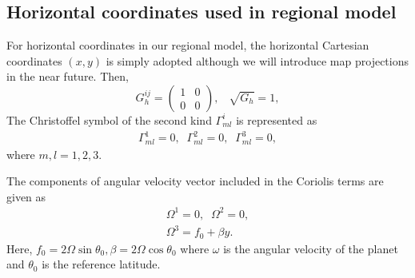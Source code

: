 \subsection{Horizontal coordinates used in regional model}
For horizontal coordinates in our regional model, 
the horizontal Cartesian coordinates $(x, y)$ is simply adopted 
although we will introduce map projections in the near future. 
Then, 
\begin{equation}
    G_h^{ij} =  \begin{pmatrix}
        1 & 0 \\
        0 & 0
      \end{pmatrix}, \;\;\;
    \sqrt{G_h}=1, 
\label{eq:metric_tensor_Jacobian_regional_model}
\end{equation}
The Christoffel symbol of the second kind  $\Gamma^i_{ml}$ is represented as 
\begin{align}
  \Gamma^1_{ml} = 0, \;\; \Gamma^2_{ml} = 0, \;\; \Gamma^3_{ml} = 0, 
\label{eq:ChristoffelSymbol2ndKind_regional_model}
\end{align}
where $m,l=1,2,3$. 


The components of angular velocity vector included in the Coriolis terms
are given as
\begin{align}
  \Omega^1 = 0, \;\;
  \Omega^2 = 0, \nonumber \\
  \Omega^3 = f_0 + \beta y.
\end{align}
Here, 
$f_0=2 \Omega \sin{\theta_0}, \beta= 2\Omega \cos{\theta_0}$ 
where 
$\omega$ is the angular velocity of the planet and $\theta_0$ is the reference latitude. 




